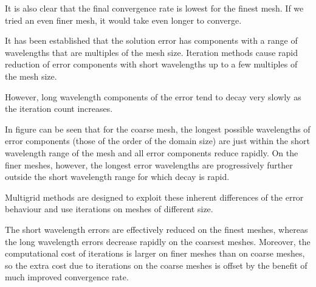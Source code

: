 \documentclass[a4paper, 15pt]{article}
\begin{document}
It
is also clear that the final convergence rate is lowest for the
finest mesh. 
If
we tried an even finer mesh, it would take even longer to
converge. \newline 

It
has been established that the solution error has components with a range of wavelengths that
are multiples of the mesh size. Iteration
methods cause rapid reduction of error components with short wavelengths up to a few
multiples of the mesh size. 

However,
long wavelength components of the error tend to decay very slowly as the iteration
count increases. \newline 

In figure can be seen that for
the coarse mesh, the longest possible wavelengths of error components (those of the
order of the domain size) are just within the short wavelength range of the mesh and all
error components reduce rapidly. On
the finer meshes, however, the longest error wavelengths are progressively further outside
the short wavelength range for which decay is rapid. \newline 

Multigrid
methods are designed to exploit these inherent differences of the error behaviour and
use iterations on meshes of different size. \newline 

The
short wavelength errors are effectively reduced on the finest meshes, whereas the long
wavelength errors decrease rapidly on the coarsest meshes. 
Moreover,
the computational cost of iterations is larger on finer meshes than on coarse meshes,
so the extra cost due to iterations on the coarse meshes is offset by the benefit of much
improved convergence rate.
\end{document}
